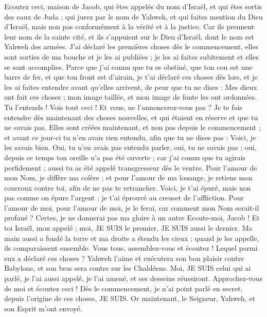 \begin{multicols}{2}
\VerseOne{}Ecoutez ceci, maison de Jacob, qui êtes appelés du nom d'Israël, et qui êtes sortis des eaux de Juda ; qui jurez par le nom de Yahweh, et qui faites mention du Dieu d'Israël, mais non pas conformément à la vérité et à la justice.
Car ils prennent leur nom de la sainte cité, et ils s'appuient sur le Dieu d'Israël, dont le nom est Yahweh des armées.
J'ai déclaré les premières choses dès le commencement, elles sont sorties de ma bouche et je les ai publiées ; je les ai faites subitement et elles se sont accomplies.
Parce que j'ai connu que tu es obstiné, que ton cou est une barre de fer, et que ton front est d'airain,
je t'ai déclaré ces choses dès lors, et je les ai faites entendre avant qu'elles arrivent, de peur que tu ne dises : Mes dieux ont fait ces choses ; mon image taillée, et mon image de fonte les ont ordonnées.
Tu l'entends ! Vois tout ceci ! Et vous, ne l'annoncerez-vous pas ? Je te fais entendre dès maintenant des choses nouvelles, et qui étaient en réserve et que tu ne savais pas.
Elles sont créées maintenant, et non pas depuis le commencement ; et avant ce jour-ci tu n'en avais rien entendu, afin que tu ne dises pas : Voici, je les savais bien.
Oui, tu n'en avais pas entendu parler, oui, tu ne savais pas ; oui, depuis ce temps ton oreille n'a pas été ouverte ; car j'ai connu que tu agirais perfidement ; aussi tu as été appelé transgresseur dès le ventre.
Pour l'amour de mon Nom, je diffère ma colère ; et pour l'amour de ma louange, je retiens mon courroux contre toi, afin de ne pas te retrancher.
Voici, je t'ai épuré, mais non pas comme on épure l'argent ; je t'ai éprouvé au creuset de l'affliction.
Pour l'amour de moi, pour l'amour de moi, je le ferai, car comment mon Nom serait-il profané ? Certes, je ne donnerai pas ma gloire à un autre
Ecoute-moi, Jacob ! Et toi Israël, mon appelé ; moi, JE SUIS le premier, JE SUIS aussi le dernier.
Ma main aussi a fondé la terre et ma droite a étendu les cieux ; quand je les appelle, ils comparaissent ensemble.
Vous tous, assemblez-vous et écoutez ! Lequel parmi eux a déclaré ces choses ? Yahweh l'aime et exécutera son bon plaisir contre Babylone, et son bras sera contre sur les Chaldéens.
Moi, JE SUIS celui qui ai parlé, je l'ai aussi appelé, je l'ai amené, et ses desseins réussiront.
Approchez-vous de moi et écoutez ceci ! Dès le commencement, je n'ai point parlé en secret, depuis l'origine de ces choses, JE SUIS. Or maintenant, le Seigneur, Yahweh, et son Esprit m'ont envoyé.

\end{multicols}
